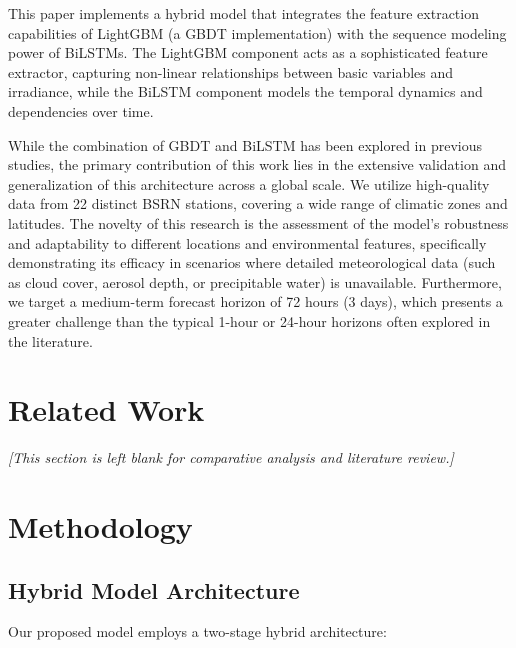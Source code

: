 \documentclass{article}
\begin{document}
This paper implements a hybrid model that integrates the feature extraction capabilities of LightGBM (a GBDT implementation) with the sequence modeling power of BiLSTMs. The LightGBM component acts as a sophisticated feature extractor, capturing non-linear relationships between basic variables and irradiance, while the BiLSTM component models the temporal dynamics and dependencies over time.

While the combination of GBDT and BiLSTM has been explored in previous studies, the primary contribution of this work lies in the extensive validation and generalization of this architecture across a global scale. We utilize high-quality data from 22 distinct BSRN stations, covering a wide range of climatic zones and latitudes. The novelty of this research is the assessment of the model's robustness and adaptability to different locations and environmental features, specifically demonstrating its efficacy in scenarios where detailed meteorological data (such as cloud cover, aerosol depth, or precipitable water) is unavailable. Furthermore, we target a medium-term forecast horizon of 72 hours (3 days), which presents a greater challenge than the typical 1-hour or 24-hour horizons often explored in the literature.

\section{Related Work}
\textit{[This section is left blank for comparative analysis and literature review.]}

\section{Methodology}

\subsection{Hybrid Model Architecture}
Our proposed model employs a two-stage hybrid architecture:
\end{document}
